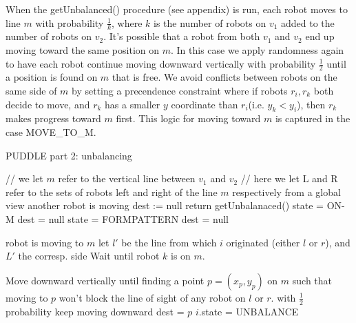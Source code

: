 \documentclass[preprint,10pt]{elsarticle}
\begin{document}
	When the getUnbalanced() procedure (see appendix) is run, each robot moves to line $m$ with probability 
	$\frac{1}{k}$, where $k$ is the number of robots on $v_1$ added to the number of robots on $v_2$.
	It's possible that a robot from both $v_1$ and $v_2$ end up moving toward the same position on 
	$m$. In this case we apply randomness again to have each robot continue moving downward vertically
	with probability $\frac{1}{2}$ until a position is found on $m$ that is free. We avoid
	conflicts between robots on the same side of $m$ by setting a precendence constraint where if robots 
	$r_i,r_k$ both decide to move, and $r_k$ has a smaller $y$ coordinate than $r_i$(i.e. $y_k < y_i$), then $r_k$ makes
	progress toward $m$ first. This logic for moving toward $m$ is captured in the case
	MOVE\_TO\_M.

	\begin{algorithm}[H]
	\begin{algorithmic}[1]
	\caption{PUDDLE part 2: unbalancing}
		
			\State //  we let $m$ refer to the vertical line between $v_1$ and $v_2$
			\State // here we let L and R refer to the sets of robots left and right of the line $m$ respectively from a global view
			\State
				 \Comment another robot is moving
					\State dest := null
					\State return
				\EndIf
					\State getUnbalanaced()
					\State state = ON-M
					\State dest = null
				\Else
					\State state = FORMPATTERN
					\State dest = null
				\EndIf
			\EndCase

				\Comment robot is moving to $m$
					\State let $l'$ be the line from which $i$ originated (either $l$ or $r$), and $L'$ the corresp. side
						\State Wait until robot $k$ is on $m$.
					\EndWhile

					\State Move downward vertically until finding a point $p = (x_p, y_p)$ on $m$ such that 
						moving to $p$ won't block the line of sight of any robot on $l$ or $r$.
						\State with $\frac{1}{2}$ probability keep moving downward
					\EndWhile
						\State dest = $p$
						\State $i$.state = UNBALANCE
			\EndCase
			\State
	\EndProcedure
	\end{algorithmic}
	\end{algorithm}
\end{document}
